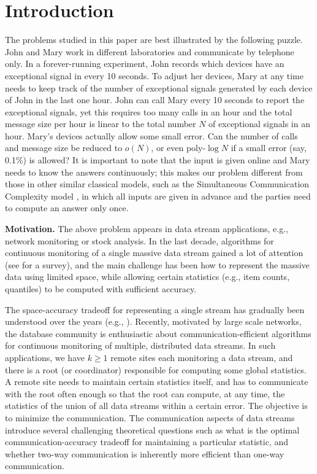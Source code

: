 \documentclass[proceedings]{stacs}
\theoremstyle{definition}\newtheorem{fact}{Fact}
\begin{document}
\section{Introduction}
The problems studied in this paper are best illustrated by the following
puzzle. John and Mary work in different laboratories and communicate by
telephone only.  In a forever-running experiment, John records which
devices have an exceptional signal in every 10 seconds.
To adjust her devices, Mary at any time needs to keep track of the number of
exceptional signals generated by each device of John in the last one hour.
John can call Mary every 10 seconds to report the exceptional signals,
yet this requires too many calls in an hour and the total
message size per hour is linear to
the total number $N$ of exceptional signals in an hour.
Mary's devices actually allow some small error.  Can the number of
calls and message size be
reduced to $o(N)$, or even poly-$\log N$ if a small error (say, 0.1\%)
is allowed?
It is important to note that the input is given online
and Mary needs to know the answers continuously;
this makes our problem different from those in other similar classical
models, such as the
Simultaneous Communication
Complexity model \cite{BabaiGKL04}, in which all inputs
are given in advance and the parties need to
compute an answer only once.

\vspace{0.5ex}
{\bf Motivation.}
The above problem appears in data stream applications, e.g.,
network monitoring or stock analysis.
In the last decade, algorithms for continuous monitoring of a
single  massive data stream gained
a lot of attention (see \cite{Aggarwal06,Muthukrishnan05} for a survey), and
the main challenge has been how to represent the massive data
using limited space, while allowing
certain statistics (e.g., item counts, quantiles)
to be computed with sufficient accuracy.

The space-accuracy tradeoff for representing a single stream
has gradually been
understood over the years (e.g., \cite{AlonMS02,Indyk00,GuhaKS01,DemaineLM02}).
Recently, motivated by large scale networks,
the database community is enthusiastic about
communication-efficient algorithms for
continuous monitoring of
multiple, distributed data streams.
In such applications, we have $k \ge 1$ remote sites
each monitoring a data stream, and there is a
root (or coordinator) responsible for computing some global
statistics.  A remote site needs to
maintain certain statistics itself, and has to
communicate with the root often enough so that
the root can compute, at any time,
the statistics of the union of all
data streams within a certain error.
The objective is to minimize the communication.
The communication aspects of data streams introduce several challenging
theoretical questions such as
what is the optimal communication-accuracy tradeoff for maintaining a
particular statistic, and whether two-way communication is inherently
more efficient than one-way communication.
\end{document}
